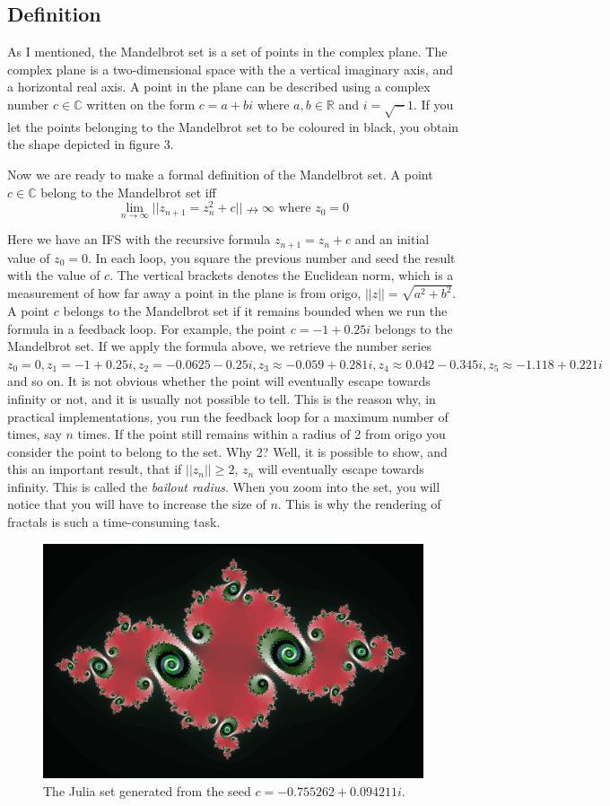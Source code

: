 \documentclass{article}
\begin{document}
\subsection{Definition}
As I mentioned, the Mandelbrot set is a set of points in the complex plane. The complex plane is a two-dimensional space with the a vertical imaginary axis, and a horizontal real axis. A point in the plane can be described using a complex number $c\in \mathbb{C}$ written on the form $c=a+bi$ where $a,b\in \mathbb{R}$ and $i=\sqrt-1$. If you let the points belonging to the Mandelbrot set to be coloured in black, you obtain the shape depicted in figure 3.

Now we are ready to make a formal definition of the Mandelbrot set. A point $c \in \mathbb{C}$ belong to the Mandelbrot set iff
\[
\lim_{n\to \infty} || z_{n+1}=z_{n}^2+c || \nrightarrow \infty
\text{ where }z_{0}=0
\]

Here we have an IFS with the recursive formula $z_{n+1}=z_{n}+c$ and an initial value of $z_{0}=0$. In each loop, you square the previous number and seed the result with the value of $c$. The vertical brackets denotes the Euclidean norm, which is a measurement of how far away a point in the plane is from origo, $||z||=\sqrt{a^2+b^2}$. A point $c$ belongs to the Mandelbrot set if it remains bounded when we run the formula in a feedback loop. For example, the point $c=-1+0.25i$ belongs to the Mandelbrot set. If we apply the formula above, we retrieve the number series $z_{0}=0, z_{1}=-1+0.25i, z_{2}=-0.0625-0.25i, z_{3}\approx-0.059+0.281i, z_{4}\approx0.042-0.345i, z_{5}\approx-1.118+0.221i$ and so on. It is not obvious whether the point will eventually escape towards infinity or not, and it is usually not possible to tell. This is the reason why, in practical implementations, you run the feedback loop for a maximum number of times, say $n$ times. If the point still remains within a radius of 2 from origo you consider the point to belong to the set. Why 2? Well, it is possible to show, and this an important result, that if $||z_{n}||\ge 2$, $z_{n}$ will eventually escape towards infinity\cite{weisstein-mandelbrot}. This is called the \textit{bailout radius}. When you zoom into the set, you will notice that you will have to increase the size of $n$. This is why the rendering of fractals is such a time-consuming task.
\begin{figure}[ht]
\centering
\includegraphics[width=120mm]{julia.png}
\caption{The Julia set generated from the seed $c=-0.755262+0.094211i$.}
\end{figure}
\end{document}

